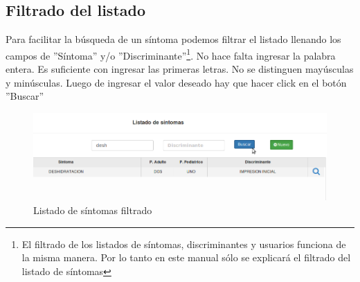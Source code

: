 \subsection{Filtrado del listado}
Para facilitar la búsqueda de un síntoma podemos filtrar el listado llenando los campos de ''Síntoma'' y/o ''Discriminante''\footnote{El filtrado de los listados de síntomas, discriminantes y usuarios funciona de la misma manera. Por lo tanto en este manual sólo se explicará el filtrado del listado de síntomas}. No hace falta ingresar la palabra entera. Es suficiente con ingresar las primeras letras. No se distinguen mayúsculas y minúsculas. Luego de ingresar el valor deseado hay que hacer click en el botón ''Buscar''

\begin{figure}[h]
\centerline{\includegraphics[width=1\textwidth]{sintomas_listado_filtro.png}}
\caption{Listado de síntomas filtrado}
\end{figure}

